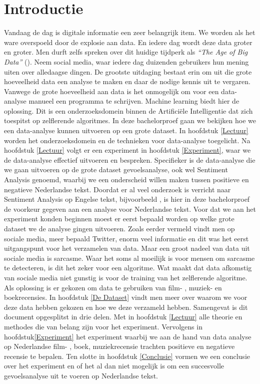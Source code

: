 \chapter{Introductie}\label{introductie}
Vandaag de dag is digitale informatie een zeer belangrijk item. We worden als het ware overspoeld door de explosie aan data. En iedere dag wordt deze data groter en groter. Men durft zelfs spreken over dit huidige tijdperk als \textit{``The Age of Big Data''} (\cite{lohr2012age}). Neem social media, waar iedere dag duizenden gebruikers hun mening uiten over alledaagse dingen. De grootste uitdaging bestaat erin om uit die grote hoeveelheid data een analyse te maken en daar de nodige kennis uit te vergaren. Vanwege de grote hoeveelheid aan data is het onmogelijk om voor een data-analyse manueel een programma te schrijven. Machine learning biedt hier de oplossing. Dit is een onderzoeksdomein binnen de Artifici\"ele Intelligentie dat zich toespitst op zelflerende algoritmes. In deze bachelorproef gaan we bekijken hoe we een data-analyse kunnen uitvoeren op een grote dataset. In hoofdstuk \ref{Lectuur} worden het onderzoeksdomein en de technieken voor data-analyse toegelicht. Na hoofdstuk \ref{Lectuur} volgt er een experiment in hoofdstuk \ref{Experiment}, waar we de data-analyse effectief uitvoeren en bespreken.
\newline
Specifieker is de data-analyse die we gaan uitvoeren op de grote dataset gevoelsanalyse, ook wel Sentiment Analysis genoemd, waarbij we een onderscheid willen maken tussen positieve en negatieve Nederlandse tekst. Doordat er al veel onderzoek is verricht naar Sentiment Analysis op Engelse tekst, bijvoorbeeld \cite{pang2008opinion}, is hier in deze bachelorproef de voorkeur gegeven aan een analyse voor Nederlandse tekst.
\newline
Voor dat we aan het experiment konden beginnen moest er eerst bepaald worden op welke grote dataset we de analyse gingen uitvoeren. Zoals eerder vermeld vindt men op sociale media, meer bepaald Twitter, enorm veel informatie en dit was het eerst uitgangspunt voor het verzamelen van data. Maar een groot nadeel van data uit sociale media is sarcasme. Waar het soms al moeilijk is voor mensen om sarcasme te detecteren, is dit het zeker voor een algoritme. Wat maakt dat data afkomstig van sociale media niet gunstig is voor de training van het zelflerende algoritme. Als oplossing is er gekozen om data te gebruiken van film- , muziek- en boekrecensies. In hoofdstuk \ref{De Dataset} vindt men meer over waarom we voor deze data hebben gekozen en hoe we deze verzameld hebben.
\newline
Samengevat is dit document opgesplitst in drie delen. Met in hoofdstuk \ref{Lectuur} alle theorie en methodes die van belang zijn voor het experiment. Vervolgens in hoofdstuk\ref{Experiment} het experiment waarbij we aan de hand van data analyse op Nederlandse film- , boek, muziekrecensie trachten positieve en negatieve recensie te bepalen. Ten slotte in hoofdstuk \ref{Conclusie} vormen we een conclusie over het experiment en of het al dan niet mogelijk is om een succesvolle gevoelsanalyse uit te voeren op Nederlandse tekst.